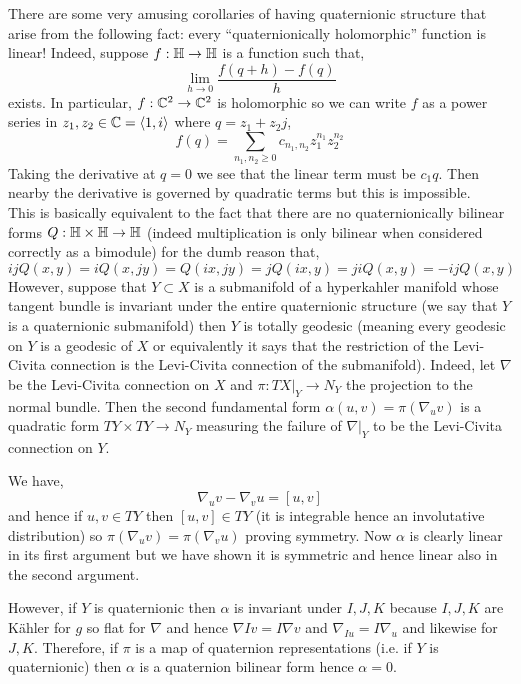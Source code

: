 \documentclass[12pt]{article}
\begin{document}
There are some very amusing corollaries of having quaternionic structure that arise from the following fact: every ``quaternionically holomorphic'' function is linear! Indeed, suppose $f : \mathbb{H} \to \mathbb{H}$ is a function such that,
\[ \lim_{h \to 0} \frac{f(q + h) - f(q)}{h} \]
exists. In particular, $f : \mathbb{C}^2 \to \mathbb{C}^2$ is holomorphic so we can write $f$ as a power series in $z_1, z_2 \in \mathbb{C} = \left< 1, i \right>$ where $q = z_1 + z_2 j$,
\[ f(q) = \sum_{n_1, n_2 \ge 0} c_{n_1, n_2} z_1^{n_1} z_2^{n_2} \]
Taking the derivative at $q = 0$ we see that the linear term must be $c_1 q$. Then nearby the derivative is governed by quadratic terms but this is impossible. 
\bigskip\\
This is basically equivalent to the fact that there are no quaternionically bilinear forms $Q : \mathbb{H} \times \mathbb{H} \to \mathbb{H}$ (indeed multiplication is only bilinear when considered correctly as a bimodule) for the dumb reason that,
\[ ij Q(x,y) = i Q(x, j y) = Q(ix, jy) = j Q(ix, y) = ji Q(x,y) = -ij Q(x,y) \]
However, suppose that $Y \subset X$ is a submanifold of a hyperkahler manifold whose tangent bundle is invariant under the entire quaternionic structure (we say that $Y$ is a quaternionic submanifold) then $Y$ is totally geodesic (meaning every geodesic on $Y$ is a geodesic of $X$ or equivalently it says that the restriction of the Levi-Civita connection is the Levi-Civita connection of the submanifold). Indeed, let $\nabla$ be the Levi-Civita connection on $X$ and $\pi : T X|_Y \to N_Y$ the projection to the normal bundle. Then the second fundamental form $\alpha(u,v) = \pi(\nabla_u v)$ is a quadratic form $T Y \times T Y \to N_Y$ measuring the failure of $\nabla|_Y$ to be the Levi-Civita connection on $Y$.


\begin{rmk}
We have, 
\[ \nabla_u v - \nabla_v u = [u,v] \]
and hence if $u, v \in TY$ then $[u,v] \in TY$ (it is integrable hence an involutative distribution) so $\pi(\nabla_u v) = \pi(\nabla_v u)$ proving symmetry. Now $\alpha$ is clearly linear in its first argument but we have shown it is symmetric and hence linear also in the second argument. 
\end{rmk}

However, if $Y$ is quaternionic then $\alpha$ is invariant under $I,J,K$ because $I,J,K$ are K\"{a}hler for $g$ so flat for $\nabla$ and hence $\nabla Iv = I \nabla v$ and $\nabla_{I u} = I \nabla_u$ and likewise for $J,K$. Therefore, if $\pi$ is a map of quaternion representations (i.e. if $Y$ is quaternionic) then $\alpha$ is a quaternion bilinear form hence $\alpha = 0$.
\end{document}
